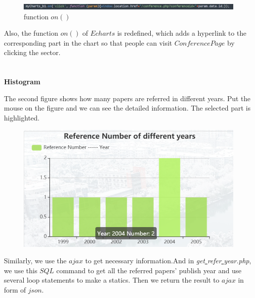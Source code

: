 \documentclass{article}
\begin{document}
	\begin{figure}[H]
		\centering
		\includegraphics[width=0.9\linewidth]{p_12.png}
		\caption{function \(on()\)}
	\end{figure}
	Also, the function \(on()\) of \(Echarts\) is redefined, which adds a hyperlink to the corresponding part in the chart so that people can visit \(Conference Page\) by clicking the sector.
	\\
	\\
	\\
	\textbf{Histogram}
	\par The second figure shows how many papers are referred in different years. Put the mouse on the figure and we can see the detailed information. The selected part is highlighted.
	\begin{figure}[H]
		\centering
		\includegraphics[width=0.6\linewidth]{p_5.png}
	\end{figure}
	Similarly, we use the \(ajax\) to get necessary information.And in \emph{get\underline{ }refer\underline{ }year.php}, we use this \(SQL\) command to get all the referred papers' publish year and use several loop statements to make a statics. Then we return the result to \(ajax\) in form of \(json\).
\end{document}
